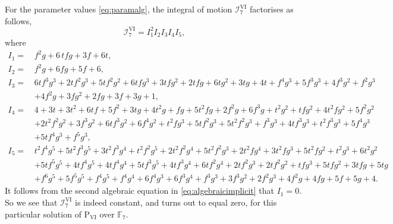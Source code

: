 \documentclass[a4paper,reqno]{amsart}
\numberwithin{equation}{section}
\numberwithin{figure}{section}
\theoremstyle{remark}
\newcommand\Psix{\textrm{P}_{\textrm{VI}}}
\begin{document}
For the parameter values \eqref{eq:paramalg}, the integral of motion $\mathcal{I}_7^\textrm{VI}$ factorises as follows,
\begin{equation*}
    \mathcal{I}_7^\textrm{VI}=I_1^2I_2I_3I_4I_5,
\end{equation*}
where
\begin{align*}
    I_1=\,&f^2 g+6\, t f g +3 f+6 t,\\
    I_2=\,&f^2 g+6 f g+5 f+6,\\
    I_3=\,&6 t f^3 g^3+2 t f^2 g^3+5 t f^2 g^2+6 t f g^3+3 t f g^2+2 t f g+6 t g^2+3 t g+4 t+f^4 g^3+5 f^3 g^3+4 f^3 g^2+f^2 g^3\\
    &+4 f^2 g+3 f g^2+2 f g+3 f+3 g+1,\\
    I_4=\,&4 + 3 t + 3 t^2 + 6 t f + 5 f^2 + 3 t g + 4 t^2 g + f g + 5 t^2 f g + 
 2 f^2 g + 6 f^3 g + t^2 g^2 + t f g^2 + 4 t^2 f g^2 + 5 f^2 g^2\\
 &+ 
 2 t^2 f^2 g^2 + 3 f^3 g^2 + 6 t f^3 g^2 + 6 f^4 g^2 + t^2 f g^3 + 
 5 t f^2 g^3 + 5 t^2 f^2 g^3 + f^3 g^3 + 4 t f^3 g^3 + t^2 f^3 g^3 + 
 5 f^4 g^3\\
 &+ 5 t f^4 g^3 + f^5 g^3,\\
 I_5=\,&t^2 f^4 g^5+5 t^2 f^3 g^5+3 t^2 f^3 g^4+t^2 f^2 g^5+2 t^2 f^2 g^4+5 t^2 f^2 g^3+2 t^2 f g^4+3 t^2 f g^3+5 t^2 f g^2+t^2 g^3+6 t^2 g^2\\
 &+5 t f^5 g^5+4 t f^4 g^5+4 t f^4 g^4+5 t f^3 g^5+4 t f^3 g^4+6 t f^2 g^4+2 t f^2 g^3+2 t f^2 g^2+t f g^3+5 t f g^2+3 t f g+5 t g\\
 &+f^6 g^5+5 f^5 g^5+f^4 g^5+f^4 g^4+6 f^4 g^3+6 f^3 g^4+f^3 g^3+3 f^3 g^2+2 f^2 g^3+4 f^2 g+4 f g+5 f+5 g+4.
\end{align*}
It follows from the second algebraic equation in \eqref{eq:algebraicimplicit} that $I_1=0$. So we see that $\mathcal{I}_7^\textrm{VI}$ is indeed constant, and turns out to equal zero, for this particular solution of $\Psix$ over $\mathbb{F}_7$.
\end{document}
